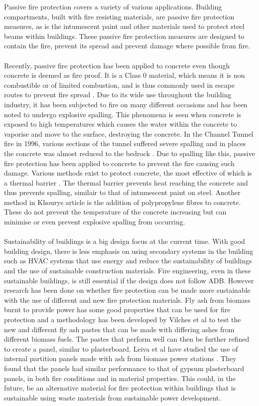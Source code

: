 \documentclass[table,a4paper,oneside]{book}
\begin{document}
Passive fire protection covers a variety of various applications. Building compartments, built with fire resisting materials, are passive fire protection measures, as is the intumescent paint and other materials used to protect steel beams within buildings. These passive fire protection measures are designed to contain the fire, prevent its spread and prevent damage where possible from fire.
\\
\\
Recently, passive fire protection has been applied to concrete even though concrete is deemed as fire proof. It is a Class 0 material, which means it is non combustible or of limited combustion, and is thus commonly used in escape routes to prevent fire spread \citep{Communities2006}. Due to its wide use throughout the building industry, it has been subjected to fire on many different occasions and has been noted to undergo explosive spalling. This phenomena is seen when concrete is exposed to high temperatures which causes the water within the concrete to vaporise and move to the surface, destroying the concrete. In the Channel Tunnel fire in 1996, various sections of the tunnel suffered severe spalling and in places the concrete was almost reduced to the bedrock \citep{Comeau1997}. Due to spalling like this, passive fire protection has been applied to concrete to prevent the fire causing such damage. Various methods exist to protect concrete, the most effective of which is a thermal barrier \citep{Khoury2008}. The thermal barrier prevents heat reaching the concrete and thus prevents spalling, similair to that of intumescent paint on steel. Another method in Khourys article is the addition of polypropylene fibres to concrete. These do not prevent the temperature of the concrete increasing but can minimise or even prevent explosive spalling from occurring.
\\
\\
Sustainability of buildings is a big design focus at the current time. With good building design, there is less emphasis on using secondary systems in the building such as HVAC systems that use energy and reduce the sustainability of buildings and the use of sustainable construction materials. Fire engineering, even in these sustainable buildings, is still essential if the design does not follow ADB. However research has been done on whether fire protection can be made more sustainable with the use of different and new fire protection materials.  Fly ash from biomass burnt to provide power has some good properties that can be used for fire protection and a methodology has been developed by Vilches et al \citep{Vilches2005776} to test the new and different fly ash pastes that can be made with differing ashes from different biomass fuels. The pastes that perform well can then be further refined to create a panel, similar to plasterboard. Leiva et al have studied the use of internal partition panels made with ash from biomass power stations \citep{Leiva2009622}. They found that the panels had similar performance to that of gypsum plasterboard panels, in both fire conditions and in material properties. This could, in the future, be an alternative material for fire protection within buildings that is sustainable  using waste materials from sustainable power development. 
\end{document}
